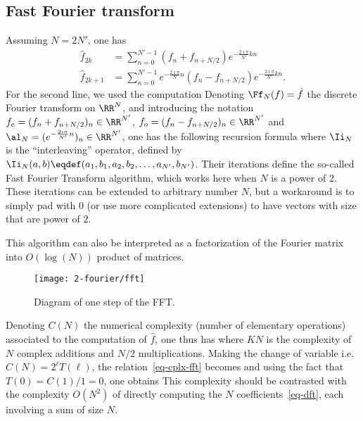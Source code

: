 \subsection{Fast Fourier transform}

Assuming $N=2N'$, one has 
\begin{align*}
	\hat f_{2k} &= \sum_{n=0}^{N'-1} (f_n + f_{n+N/2}) e^{ -\frac{2\imath\pi}{N'} k n } \\
	\hat f_{2k+1} &= \sum_{n=0}^{N'-1} e^{ -\frac{2\imath\pi}{N} n } (f_n - f_{n+N/2}) e^{ -\frac{2\imath\pi}{N'} k n }.
\end{align*}
For the second line, we used the computation
Denoting $\Ff_N(f)=\hat f$ the discrete Fourier transform on $\RR^N$, and 
introducing the notation $f_e = (f_n + f_{n+N/2})_n \in \RR^{N'}$, $f_o = (f_n - f_{n+N/2})_n \in \RR^{N'}$
and $\al_N = (  e^{ -\frac{2\imath\pi}{N'} n } )_{n} \in \RR^{N'}$, one has the following recursion formula
where $\Ii_N$ is the ``interleaving'' operator, defined by $\Ii_N(a,b) \eqdef (a_1,b_1,a_2,b_2,\ldots,a_{N'},b_{N'})$.
%
Their iterations define the so-called Fast Fourier Transform algorithm, which works here when $N$ is a power of 2. These iterations can be extended to arbitrary number $N$, but a workaround is to simply pad with 0 (or use more complicated extensions) to have vectors with size that are power of $2$. 

This algorithm can also be interpreted as a factorization of the Fourier matrix into $O(\log(N))$ product of matrices. 

\begin{figure}
\centering
\texttt{[image: 2-fourier/fft]}
\caption{\label{fig-fft}
Diagram of one step of the FFT.
}
\end{figure}
 

Denoting $C(N)$ the numerical complexity (number of elementary operations) associated to the computation of $\hat f$, one thus has
where $K N$ is the complexity of $N$ complex additions and $N/2$ multiplications. Making the change of variable 
i.e. $C(N)=2^\ell T(\ell)$, the relation~\eqref{eq-cplx-fft} becomes
and using the fact that $T(0)=C(1)/1=0$, one obtains
This complexity should be contrasted with the complexity $O(N^2)$ of directly computing the $N$ coefficients~\eqref{eq-dft}, each involving a sum of size $N$. 


